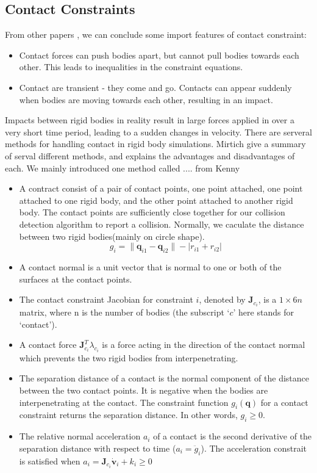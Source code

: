     \subsection{Contact Constraints}
        From other papers \cite{bender2014interactive}, we can conclude some import features of contact constraint:
        \begin{itemize}
            \item Contact forces can push bodies apart, but cannot pull bodies towards each other. This leads to inequalities in the constraint equations.
            \item Contact are transient - they come and go. Contacts can appear suddenly when bodies are moving towards each other, resulting in an impact.
        \end{itemize}
        Impacts between rigid bodies in reality result in large forces applied in over a very short time period, leading to a sudden changes in velocity. There are serveral methods for handling contact in rigid body simulations. Mirtich\cite{mirtich1998rigid} give a summary of serval different methods, and explains the advantages and disadvantages of each. We mainly introduced one  method called .... from Kenny\cite{erleben2017rigid}
        \begin{itemize}
            \item A contract consist of a pair of contact points, one point attached, one point attached to one rigid body, and the other point attached to another rigid body. The contact points are sufficiently close together for our collision detection algorithm to report a collision. Normally, we caculate the distance between two rigid bodies(mainly on circle shape).
            \begin{equation}
                g_i = \|\pmb{q}_{i1} - \pmb{q}_{i2}\| - |r_{i1} + r_{i2}|
            \end{equation}
            \item A contact normal is a unit vector that is normal to one or both of the surfaces at the contact points.
            \item The contact constraint Jacobian for constraint $i$, denoted by $\pmb{J}_{c_i}$, is a $1\times 6n$ matrix, where n is the number of bodies (the subscript `$c$' here stands for `contact').
            \item A contact force $\pmb{J}_{c_i}^{T}\lambda _{c_i}$ is a force acting in the direction of the contact normal which prevents the two rigid bodies from interpenetrating.
            \item The separation distance of a contact is the normal component of the distance between the two contact points. It is negative when the bodies are interpenetrating at the contact. The constraint function $g_{i}(\pmb{q})$ for a contact constraint returns the separation distance. In other words, $g_i \ge 0$.
            \item The relative normal acceleration $a_i$ of a contact is the second derivative of the separation distance with respect to time ($a_i = \ddot{g}_i$). The acceleration constrait is satisfied when $a_i = \pmb{J}_{c_i} \dot{\mathbf{v}}_i+ k_i \ge 0$
        \end{itemize}
